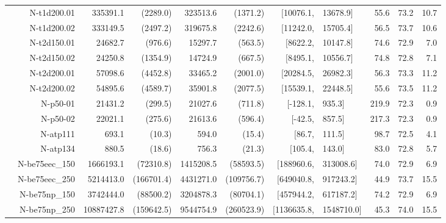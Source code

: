 \documentclass[runningheads]{llncs}
\begin{document}
\begin{table}[tb]
{\begin{tabular}{r@{\hskip -2ex}*{5}{r}rl@{\hskip -2ex}*{3}{r}}
     & N-t1d200.01      & 335391.1                & (2289.0)   & 323513.6  & (1371.2)               & $[$10076.1,   & 13678.9$]$    & 55.6 & 73.2 & 10.7 \\
     & N-t1d200.02      & 333149.5                & (2497.2)   & 319675.8  & (2242.6)               & $[$11242.0,   & 15705.4$]$    & 56.5 & 73.7 & 10.6 \\
     & N-t2d150.01      & 24682.7                 & (976.6)    & 15297.7   & (563.5)                & $[$8622.2,    & 10147.8$]$    & 74.6 & 72.9 & 7.0  \\
     & N-t2d150.02      & 24250.8                 & (1354.9)   & 14724.9   & (667.5)                & $[$8495.1,    & 10556.7$]$    & 74.8 & 72.8 & 7.1  \\
     & N-t2d200.01      & 57098.6                 & (4452.8)   & 33465.2   & (2001.0)               & $[$20284.5,   & 26982.3$]$    & 56.3 & 73.3 & 11.2 \\
     & N-t2d200.02      & 54895.6                 & (4589.7)   & 35901.8   & (2077.5)               & $[$15539.1,   & 22448.5$]$    & 55.6 & 73.5 & 11.2 \\
     & N-p50-01         & 21431.2                 & (299.5)    & 21027.6   & (711.8)                & $[$-128.1,    & 935.3$]$      & 219.9& 72.3 & 0.9  \\
     & N-p50-02         & 22021.1                 & (275.6)    & 21613.6   & (596.4)                & $[$-42.5,     & 857.5$]$      & 217.3& 72.3 & 0.9  \\
     & N-atp111         & 693.1                   & (10.3)     & 594.0     & (15.4)                 & $[$86.7,      & 111.5$]$      & 98.7 & 72.5 & 4.1  \\
     & N-atp134         & 880.5                   & (18.6)     & 756.3     & (21.3)                 & $[$105.4,     & 143.0$]$      & 83.0 & 72.8 & 5.7  \\
     & N-be75eec\_150   & 1666193.1               & (72310.8)  & 1415208.5 & (58593.5)              & $[$188960.6,  & 313008.6$]$   & 74.0 & 72.9 & 6.9  \\
     & N-be75eec\_250   & 5214413.0               & (166701.4) & 4431271.0 & (109756.7)             & $[$649040.8,  & 917243.2$]$   & 44.9 & 73.7 & 15.5 \\
     & N-be75np\_150    & 3742444.0               & (88500.2)  & 3204878.3 & (80704.1)              & $[$457944.2,  & 617187.2$]$   & 74.2 & 72.9 & 6.9  \\
     & N-be75np\_250    & 10887427.8              & (159642.5) & 9544754.9 & (260523.9)             & $[$1136635.8, & 1548710.0$]$  & 45.3 & 74.0 & 15.5 \\\midrule

\end{tabular}}
\end{table}
\end{document}
